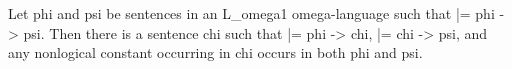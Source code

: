 Let phi and psi be sentences in an L_{omega1 omega}-language such that |= phi -> psi. Then there is a sentence chi such that |= phi -> chi, |= chi -> psi, and any nonlogical constant occurring in chi occurs in both phi and psi.
